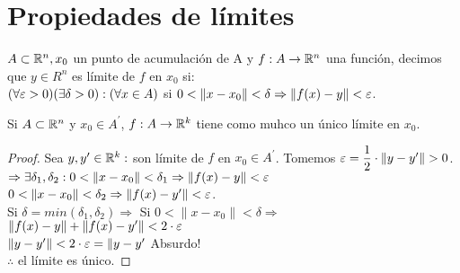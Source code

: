 \section{Propiedades de límites}

\begin{definition}[Límite]
  $A \subset \mathbb{R}^n, x_0$ un punto de acumulación de A y $f: A \to \mathbb{R}^n$ una función, decimos que $y \in R^n$ es límite de $f$ en $x_0$ si: \\
  $(\forall \varepsilon > 0)(\exists \delta>0) : (\forall x \in A)$ si $0 < \|x - x_0\| < \delta \Rightarrow \|f(x) - y\| < \varepsilon$.
\end{definition}

\begin{lemma}
  Si $A \subset \mathbb{R}^n$ y $x_0 \in A^{\prime}$, $f: A \to \mathbb{R}^k$ tiene como muhco un único límite en $x_0$.
  \begin{proof}
    Sea $y, y^{\prime} \in \mathbb{R}^k : $ son límite de $f$ en $x_0 \in A^{\prime}$. Tomemos $\varepsilon = \dfrac{1}{2} \cdot \|y - y^{\prime}\| > 0$. \\
    $\Rightarrow \exists \delta_1, \delta_2 : 0 < \| x - x_0 \| < \delta_1 \Rightarrow \|f(x) - y \| < \varepsilon$ \\
    $0 < \|x - x_0\| < \delta_2 \Rightarrow \|f(x) - y^{\prime}\| < \varepsilon$. \\
    Si $\delta = min(\delta_1, \delta_2) \Rightarrow$ Si $0 < \|x - x_0\| < \delta \Rightarrow$ \\
    $\|f(x) - y\| + \|f(x) - y^{\prime}\| < 2 \cdot \varepsilon$ \\
    $\|y - y^{\prime}\| < 2 \cdot \varepsilon = \|y - y^{\prime}$ Absurdo! \\
    $\therefore$ el límite es único.
  \end{proof}
\end{lemma}

